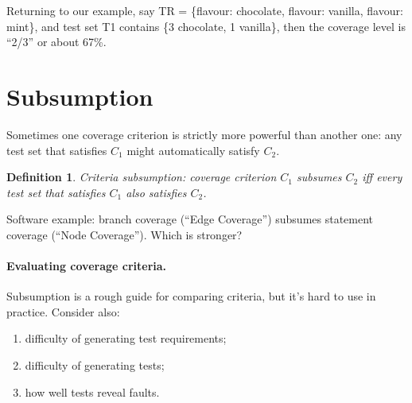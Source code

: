 \documentclass[11pt]{article}
\newtheorem{defn}{Definition}
\begin{document}
Returning to our example, say TR = 
\{flavour: chocolate, flavour: vanilla, flavour: mint\},
and test set T1 contains \{3 chocolate, 1 vanilla\}, then the coverage level is
``2/3'' or about 67\%.

\section*{Subsumption}

Sometimes one coverage criterion is strictly more powerful than another one:
any test set that satisfies $C_1$ might automatically satisfy $C_2$.

\begin{defn}
Criteria subsumption: coverage criterion $C_1$ \emph{subsumes} $C_2$ iff
\emph{every} test set that satisfies $C_1$ also satisfies $C_2$.
\end{defn}

Software example: branch coverage (``Edge Coverage'') subsumes
statement coverage (``Node Coverage''). Which is stronger?

\paragraph{Evaluating coverage criteria.} Subsumption is a rough guide for
comparing criteria, but it's hard to use in practice. Consider also:
\begin{enumerate}
\item difficulty of generating test requirements;
\item difficulty of generating tests;
\item how well tests reveal faults.
\end{enumerate}
\end{document}
